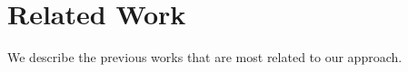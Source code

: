 \documentclass{article}
\begin{document}



\section{Related Work}
We describe the previous works that are most related to our approach.
\end{document}
